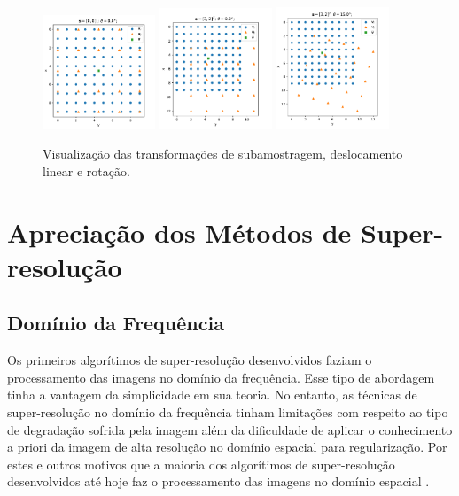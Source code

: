 \documentclass[12pt,openright,oneside,a4paper,english,brazil]{abntex2}
\begin{document}
\begin{figure}
	\centering
	\includegraphics[width=0.3\textwidth]{./figures/transform1.pdf}
	\includegraphics[width=0.3\textwidth]{./figures/transform2.pdf}
	\includegraphics[width=0.3\textwidth]{./figures/transform3.pdf}
	\caption{Visualização das transformações de subamostragem, deslocamento linear e rotação.}
	\label{fig:transformations}
\end{figure}


\section{Apreciação dos Métodos de Super-resolução} 
\subsection{Domínio da Frequência}

Os primeiros algorítimos de super-resolução desenvolvidos faziam o processamento das imagens no domínio da frequência.
Esse tipo de abordagem tinha a vantagem da simplicidade em sua teoria.
No entanto, as técnicas de super-resolução no domínio da frequência tinham limitações com respeito ao tipo de degradação sofrida pela imagem além da dificuldade de aplicar o conhecimento a priori da imagem de alta resolução no domínio espacial para regularização.
Por estes e outros motivos que a maioria dos algorítimos de super-resolução desenvolvidos até hoje faz o processamento das imagens no domínio espacial \cite{park2003super}.
\end{document}
